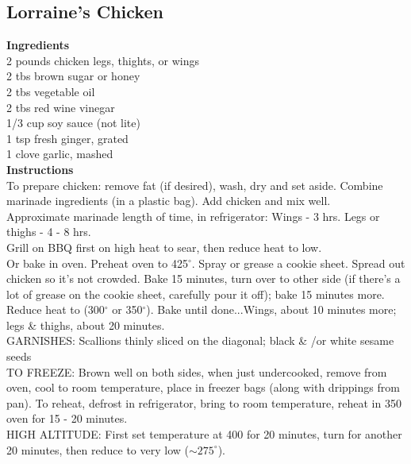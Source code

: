 \documentclass{article}
\numberwithin{figure}{section}
\numberwithin{equation}{section}
\begin{document}
\pagebreak
\subsection{Lorraine's Chicken}
{\bf Ingredients}\\
2 pounds chicken legs, thights, or wings\\
2 tbs brown sugar or honey\\
2 tbs vegetable oil\\
2 tbs red wine vinegar\\
1/3 cup soy sauce (not lite)\\
1 tsp fresh ginger, grated\\
1 clove garlic, mashed\\

{\bf Instructions}\\
To prepare chicken: remove fat (if desired), wash, dry and set aside.  Combine marinade ingredients (in a plastic bag). Add chicken and mix well.\\

Approximate marinade length of time, in refrigerator: Wings - 3 hrs.  Legs or thighs - 4 - 8 hrs.\\

Grill on BBQ first on high heat to sear, then reduce heat to low.\\

Or bake in oven.  Preheat oven to 425$^{\circ}$. Spray or grease a cookie sheet.  Spread out chicken so it's not crowded. Bake 15 minutes, turn over to other side (if there's a lot of grease on the cookie sheet, carefully pour it off); bake 15 minutes more. Reduce heat to (300$^{\circ}$ or 350$^{\circ}$). Bake until done...Wings, about 10 minutes more;  legs \& thighs, about 20 minutes.\\

GARNISHES: Scallions thinly sliced on the diagonal; black \& /or white sesame seeds\\

TO FREEZE:  Brown well on both sides, when just undercooked, remove from oven, cool to room temperature, place in freezer bags (along with drippings from pan).  To reheat, defrost in refrigerator, bring to room temperature, reheat in 350 oven for 15 - 20 minutes.\\

HIGH ALTITUDE:  First set temperature at 400 for 20 minutes, turn for another 20 minutes, then reduce to very low ($\sim 275^{\circ}$).

\pagebreak
\end{document}
